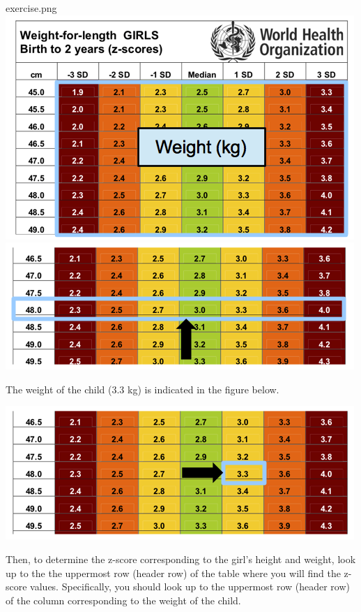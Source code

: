 \documentclass[
  12pt,
]{book}
\newenvironment{rmdexercise}
  {\begin{tcolorbox}[width=\textwidth, 
                     colback = {white}, 
                     title = {\textbf{Exercise}}, 
                     colbacktitle = lightgray,
                     coltitle = black]
  \begin{includegraphics}[scale = 1]{exercise.png}}
  {\end{includegraphics}
  \end{tcolorbox}}
\begin{document}
\begin{rmdexercise}
\includegraphics{images/whzRefTable03.png} \includegraphics{images/whzRefTable03a.png}

The weight of the child (3.3 kg) is indicated in the figure below.

\includegraphics{images/whzRefTable03b.png}

Then, to determine the z-score corresponding to the girl's height and weight, look up to the the uppermost row (header row) of the table where you will find the z-score values. Specifically, you should look up to the uppermost row (header row) of the column corresponding to the weight of the child.


\end{rmdexercise}
\end{document}

